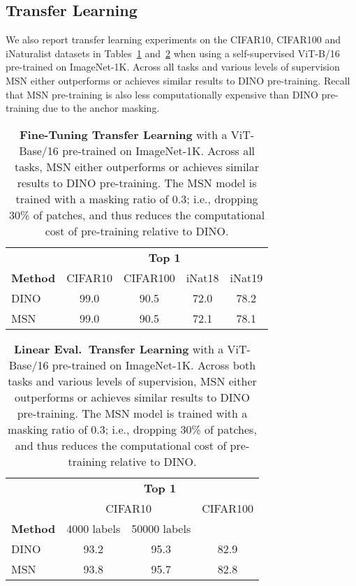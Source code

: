 \documentclass{article}
\begin{document}
\subsection{Transfer Learning}
We also report transfer learning experiments on the CIFAR10, CIFAR100 and iNaturalist datasets in Tables~\ref{tb:transfer_ft} and~\ref{tb:transfer_lin} when using a self-supervised ViT-B/16 pre-trained on ImageNet-1K. Across all tasks and various levels of supervision MSN either outperforms or achieves similar results to DINO pre-training. Recall that MSN pre-training is also less computationally expensive than DINO pre-training due to the anchor masking.
\begin{table}[h]
    \centering
    \caption{{\bf Fine-Tuning Transfer Learning} with a ViT-Base/16 pre-trained on ImageNet-1K. Across all tasks, MSN either outperforms or achieves similar results to DINO pre-training. The MSN model is trained with a masking ratio of 0.3; i.e., dropping 30\% of patches, and thus reduces the computational cost of pre-training relative to DINO.}
    \label{tb:transfer_ft}
    \begin{tabular}{l c c c c}
    & \multicolumn{4}{c}{\bf Top 1}\\[1mm]
    \bf Method & CIFAR10 & CIFAR100 & iNat18 & iNat19 \\\toprule
    DINO & 99.0 & 90.5 & 72.0 & 78.2\\
    MSN & 99.0 & 90.5 & 72.1 & 78.1\\
    \bottomrule
    \end{tabular}
\end{table}
\begin{table}[h]
    \centering
    \caption{{\bf Linear Eval.~Transfer Learning} with a ViT-Base/16 pre-trained on ImageNet-1K. Across both tasks and various levels of supervision, MSN either outperforms or achieves similar results to DINO pre-training. The MSN model is trained with a masking ratio of 0.3; i.e., dropping 30\% of patches, and thus reduces the computational cost of pre-training relative to DINO.}
    \label{tb:transfer_lin}
    \begin{tabular}{l c c c}
    & \multicolumn{3}{c}{\bf Top 1}\\[1mm]
    & \multicolumn{2}{c}{CIFAR10} & CIFAR100 \\
    \bf Method  & {\scriptsize 4000 labels}  & {\scriptsize 50000 labels} \\\toprule
    DINO & 93.2 & 95.3 & 82.9 \\
    MSN & 93.8 & 95.7 & 82.8 \\
    \bottomrule
    \end{tabular}
\end{table}
\end{document}
